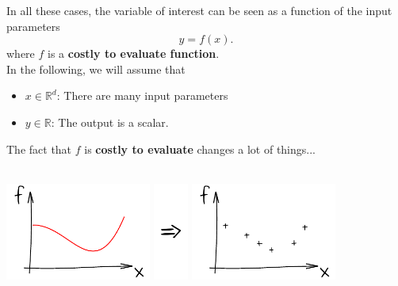 \documentclass{beamer}
\begin{document}
\begin{frame}{}
In all these cases, the variable of interest can be seen as a function of the input parameters
$$ y = f(x). $$
where $f$ is a \textbf{costly to evaluate function}. \\
\vspace{5mm}
In the following, we will assume that 
\begin{itemize}
	\item $x \in \mathds{R}^d$: There are many input parameters
	\item $y \in \mathds{R}$: The output is a scalar.
\end{itemize}
\end{frame}

\begin{frame}{}
The fact that $f$ is \textbf{costly to evaluate} changes a lot of things...\\
\vspace{5mm}
\\
\vspace{5mm}
\begin{center}
\includegraphics[height=3.2cm]{figures/ink_f} \includegraphics[height=3.2cm]{figures/Rightarrow} \includegraphics[height=3.2cm]{figures/ink_fX}
\end{center}
\end{frame}
\end{document}

